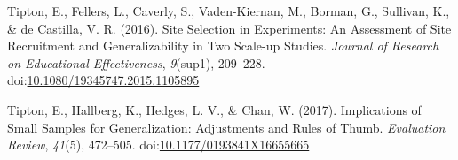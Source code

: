 \documentclass[man,floatsintext]{apa6}
\begin{document}
\leavevmode\hypertarget{ref-tiptonSiteSelectionExperiments2016}{}%
Tipton, E., Fellers, L., Caverly, S., Vaden-Kiernan, M., Borman, G., Sullivan, K., \& de Castilla, V. R. (2016). Site Selection in Experiments: An Assessment of Site Recruitment and Generalizability in Two Scale-up Studies. \emph{Journal of Research on Educational Effectiveness}, \emph{9}(sup1), 209--228. doi:\href{https://doi.org/10.1080/19345747.2015.1105895}{10.1080/19345747.2015.1105895}

\leavevmode\hypertarget{ref-tiptonImplicationsSmallSamples2017}{}%
Tipton, E., Hallberg, K., Hedges, L. V., \& Chan, W. (2017). Implications of Small Samples for Generalization: Adjustments and Rules of Thumb. \emph{Evaluation Review}, \emph{41}(5), 472--505. doi:\href{https://doi.org/10.1177/0193841X16655665}{10.1177/0193841X16655665}

\endgroup
\end{document}
